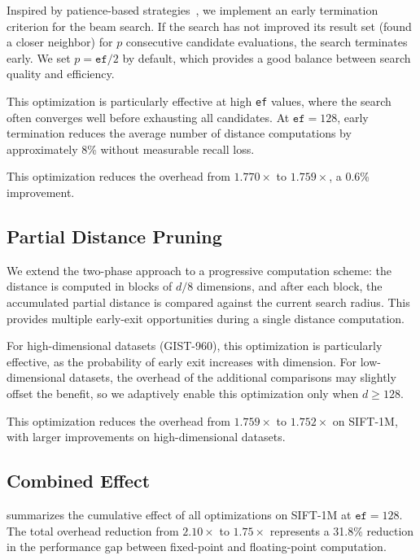 \documentclass[10pt,journal,compsoc]{IEEEtran}
\begin{document}
Inspired by patience-based strategies~\cite{teofili2025patience}, we implement an early termination criterion for the beam search. If the search has not improved its result set (found a closer neighbor) for $p$ consecutive candidate evaluations, the search terminates early. We set $p = \texttt{ef} / 2$ by default, which provides a good balance between search quality and efficiency.

This optimization is particularly effective at high \texttt{ef} values, where the search often converges well before exhausting all candidates. At $\texttt{ef} = 128$, early termination reduces the average number of distance computations by approximately 8\% without measurable recall loss.

This optimization reduces the overhead from $1.770\times$ to $1.759\times$, a 0.6\% improvement.

\subsection{Partial Distance Pruning}

We extend the two-phase approach to a progressive computation scheme: the distance is computed in blocks of $d/8$ dimensions, and after each block, the accumulated partial distance is compared against the current search radius. This provides multiple early-exit opportunities during a single distance computation.

For high-dimensional datasets (GIST-960), this optimization is particularly effective, as the probability of early exit increases with dimension. For low-dimensional datasets, the overhead of the additional comparisons may slightly offset the benefit, so we adaptively enable this optimization only when $d \geq 128$.

This optimization reduces the overhead from $1.759\times$ to $1.752\times$ on SIFT-1M, with larger improvements on high-dimensional datasets.

\subsection{Combined Effect}

 summarizes the cumulative effect of all optimizations on SIFT-1M at $\texttt{ef} = 128$. The total overhead reduction from $2.10\times$ to $1.75\times$ represents a 31.8\% reduction in the performance gap between fixed-point and floating-point computation.
\end{document}
